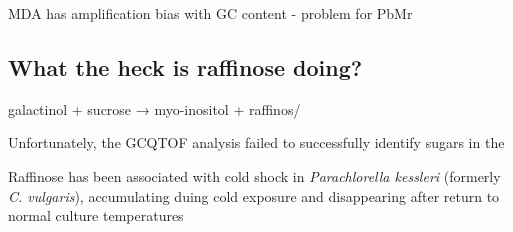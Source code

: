{{%





MDA has amplification bias with GC content - problem for PbMr \citep{Macaulay2014}

\subsection{What the heck is raffinose doing?}

galactinol + sucrose → myo-inositol + raffinos/



Unfortunately, the GCQTOF analysis failed to successfully
identify sugars in the 


Raffinose has been associated with cold shock in
\textit{Parachlorella kessleri} (formerly \textit{C. vulgaris}),
accumulating duing cold exposure and disappearing after return
to normal culture temperatures 

}}
